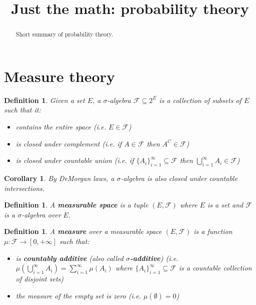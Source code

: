 \documentclass{article}
\title{Just the math: probability theory}
\date{\vspace{-5ex}}
\newtheorem{defn}[equation]{Definition}
\newtheorem{coro}[equation]{Corollary}
\begin{document}
\maketitle


\begin{abstract}
Short summary of probability theory.
\end{abstract}

\section{Measure theory}

\begin{defn}
	Given a set $E$, a $\sigma$-algebra $\mathcal{F} \subseteq 2^E$ is a collection of subsets of $E$ such that it:
	\begin{itemize}
		\item contains the entire space (i.e. $E \in \mathcal{F}$)
		\item is closed under complement (i.e. if $A \in \mathcal{F}$ then $A^C \in \mathcal{F}$)
		\item is closed under countable union (i.e. if $\{A_i\}_{i=1}^\infty \subseteq \mathcal{F}$ then $\bigcup_{i=1}^\infty A_i \in \mathcal{F}$)
	\end{itemize}
\end{defn}

\begin{coro}
	By DeMorgan laws, a $\sigma$-algebra is also closed under countable intersections.
\end{coro}

\begin{defn}
	A \textbf{measurable space} is a tuple $(E, \mathcal{F})$ where $E$ is a set and $\mathcal{F}$ is a $\sigma$-algebra over $E$.
\end{defn}

\begin{defn}
	A \textbf{measure} over a measurable space $(E, \mathcal{F})$ is a function $\mu : \mathcal{F} \to [0, +\infty]$ such that:
	\begin{itemize}
	\item is \textbf{countably additive} (also called \textbf{$\sigma$-additive}) (i.e. $\mu(\bigcup_{i=1}^\infty A_i) = \sum_{i=1}^\infty \mu( A_i)$ where $\{A_i\}_{i=1}^\infty \subseteq \mathcal{F}$ is a countable collection of disjoint sets)
	\item the measure of the empty set is zero (i.e. $\mu(\emptyset) = 0$)
\end{itemize}
\end{defn}
\end{document}
